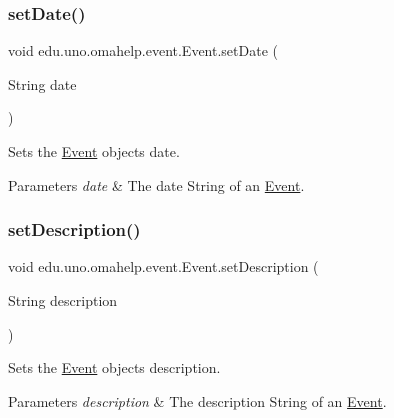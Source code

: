 \subsubsection{\texorpdfstring{set\+Date()}{setDate()}}
{\footnotesize\ttfamily void edu.\+uno.\+omahelp.\+event.\+Event.\+set\+Date (\begin{DoxyParamCaption}\item[{String}]{date }\end{DoxyParamCaption})}

Sets the \mbox{\hyperlink{classedu_1_1uno_1_1omahelp_1_1event_1_1_event}{Event}} object\textquotesingle{}s date.


\begin{DoxyParams}{Parameters}
{\em date} & The date String of an \mbox{\hyperlink{classedu_1_1uno_1_1omahelp_1_1event_1_1_event}{Event}}. \\
\hline
\end{DoxyParams}
\mbox{\label{classedu_1_1uno_1_1omahelp_1_1event_1_1_event_ad134a919e9b55383de7de2ae473a79ea}} 
\subsubsection{\texorpdfstring{set\+Description()}{setDescription()}}
{\footnotesize\ttfamily void edu.\+uno.\+omahelp.\+event.\+Event.\+set\+Description (\begin{DoxyParamCaption}\item[{String}]{description }\end{DoxyParamCaption})}

Sets the \mbox{\hyperlink{classedu_1_1uno_1_1omahelp_1_1event_1_1_event}{Event}} object\textquotesingle{}s description.


\begin{DoxyParams}{Parameters}
{\em description} & The description String of an \mbox{\hyperlink{classedu_1_1uno_1_1omahelp_1_1event_1_1_event}{Event}}. \\
\hline
\end{DoxyParams}
\mbox{\label{classedu_1_1uno_1_1omahelp_1_1event_1_1_event_aebc99e68661ca175beb01439a65a1638}} 
